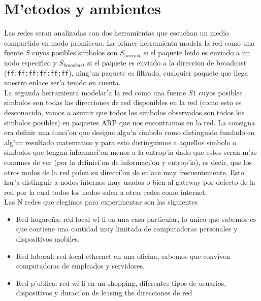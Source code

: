 \section{M'etodos y ambientes}
Las redes seran analizadas con dos herramientas que escuchan un medio compartido en modo promiscuo. La primer herramienta
 modela la red como una fuente $S$ cuyos posibles simbolos son $S_{unicast}$ si el paquete leido es enviado
 a un nodo especifico y $S_{broadcast}$ si el paquete es enviado a la direccion de broadcast (\texttt{ff:ff:ff:ff:ff:ff}), 
 ning'un paquete es filtrado, cualquier paquete que llega nuestro enlace ser'a tenido en cuenta.\\
La segunda herramienta modelar'a la red como una fuente $S1$ cuyos posibles simbolos son todas las direcciones de red disponibles
en la red (como esto es desconocido, vamos a asumir que todos los simbolos observados son todos los simbolos posibles) en 
paquetes ARP que nos encontramos en la red. La consigna era definir una funci'on que designe algu'n simbolo como distinguido
fundado en alg'un resultado matematico y para esto distinguimos a aquellos simbolo o simbolos que tengan informaci'on menor a
la entrop'ia dado que estos seran m'as comunes de ver (por la definici'on de informaci'on y entrop'ia), es decir, que los otros
nodos de la red piden su direcci'on de enlace muy frecuentemente. Esto har'a distinguir a nodos internos muy usados o bien
al gateway por defecto de la red por la cual todos los nodos salen a otras redes como internet.\\

Las N redes que elegimos para experimentar son las siguientes
\begin{itemize}
	\item Red hogare\~na: red local wi-fi en una casa particular, lo unico que sabemos es que contiene una cantidad muy
	 limitada de computadoras personales y dispositivos mobiles.
	\item Red laboral: red local ethernet en una oficina, sabemos que conviven computadoras de empleados y servidores.
	\item Red p'ublica: red wi-fi en un shopping, diferentes tipos de usuarios, dispositivos y duraci'on de leasing the direcciones de red
\end{itemize}
